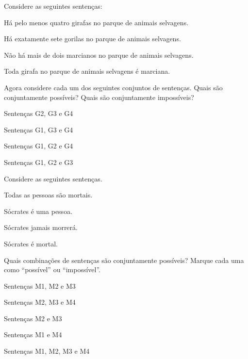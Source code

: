 \noindent \problempart Considere as seguintes sentenças: 
\begin{compactlist}%
\item[G1.] \label{itm:at_least_four}Há pelo menos quatro girafas no parque de animais selvagens.
\item[G2.] \label{itm:exactly_seven} Há exatamente sete gorilas no parque de animais selvagens.
\item[G3.] \label{itm:not_more_than_two} Não há mais de dois marcianos no parque de animais selvagens.
\item[G4.] \label{itm:martians} Toda girafa no parque de animais selvagens é marciana.
\end{compactlist}

Agora considere cada um dos seguintes conjuntos de sentenças. Quais são conjuntamente possíveis? Quais são conjuntamente impossíveis?
\begin{compactlist}
\item Sentenças G2, G3 e G4
\item Sentenças G1, G3 e G4
\item Sentenças G1, G2 e G4
\item Sentenças G1, G2 e G3
\end{compactlist}

\problempart Considere as seguintes sentenças.
\begin{compactlist}%
\item[M1.] \label{itm:allmortal} Todas as pessoas são mortais.
\item[M2.] \label{itm:socperson} Sócrates é uma pessoa.
\item[M3.] \label{itm:socnotdie} Sócrates jamais morrerá.
\item[M4.] \label{itm:socmortal} Sócrates é mortal.
\end{compactlist}
Quais combinações de sentenças são conjuntamente possíveis? Marque cada uma como \textquotedblleft possível\textquotedblright{} ou \textquotedblleft impossível\textquotedblright{}.
\begin{compactlist}
\item Sentenças M1, M2 e M3
\item Sentenças M2, M3 e M4
\item Sentenças M2 e M3
\item Sentenças M1 e M4
\item Sentenças M1, M2, M3 e M4
\end{compactlist}

